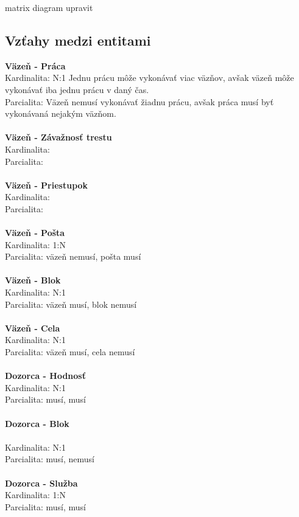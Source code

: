 		matrix diagram upravit

		\subsection{Vzťahy medzi entitami}
			\textbf{Väzeň - Práca} \\
				Kardinalita: N:1 Jednu prácu môže vykonávať viac väzňov, avšak väzeň môže vykonávať iba jednu prácu v daný čas.\\
				Parcialita: Väzeň nemusí vykonávať žiadnu prácu, avšak práca musí byť vykonávaná nejakým väzňom.\\ \\
			\textbf{Väzeň - Závažnosť trestu} \\
				Kardinalita: \\
				Parcialita: \\ \\
			\textbf{Väzeň - Priestupok} \\
				Kardinalita: \\
				Parcialita: \\ \\
			\textbf{Väzeň - Pošta} \\
				Kardinalita: 1:N\\
				Parcialita: väzeň nemusí, pošta musí\\ \\
			\textbf{Väzeň - Blok} \\
				Kardinalita: N:1\\
				Parcialita: väzeň musí, blok nemusí\\ \\
			\textbf{Väzeň - Cela} \\
				Kardinalita: N:1\\
				Parcialita: väzeň musí, cela nemusí\\ \\
			\textbf{Dozorca - Hodnosť} \\
				Kardinalita: N:1\\
				Parcialita: musí, musí\\ \\
			\textbf{Dozorca - Blok} \\ \\
				Kardinalita: N:1 \\
				Parcialita: musí, nemusí\\ \\
			\textbf{Dozorca - Služba} \\
				Kardinalita: 1:N\\
				Parcialita: musí, musí\\ \\
